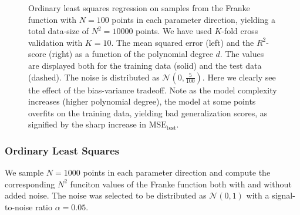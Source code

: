 \documentclass[dvipsnames, article, a4paper, oneside, 12pt]{memoir}
\newcommand{\N}{\mathcal{N}}
\begin{document}
\begin{figure}
    \centering
    \caption{Ordinary least squares regression on samples from the Franke
      function with \( N = 100 \) points in each parameter direction, yielding a total data-size of \( N^2 = 10000 \) points.
     We have used \( K \)-fold cross validation with \( K = 10 \).
     The mean squared error (left) and the \(R^2\)-score (right) as
      a function of the polynomial degree \( d \). The values are displayed
      both for the training data (solid) and the test data (dashed). The
      noise is distributed as \( \N(0, \tfrac{5}{100})\). Here we clearly see the effect of the bias-variance tradeoff. Note as the model complexity increases (higher polynomial degree), the model at some points overfits on the training data, yielding bad generalization scores, as signified by the sharp increase in \( \mathrm{MSE}_{\mathrm{test}} \).}
    \label{fig:ols_scores}
  \end{figure}

  \subsubsection{Ordinary Least Squares}
  
  We sample \( N = 1000 \) points in each parameter direction and compute the
  corresponding \( N^2 \) funciton values of the Franke function both with and
  without added noise. The noise was selected to be distributed as \( \N(0,
  1) \) with a signal-to-noise ratio \( \alpha = 0.05\).
  
\end{document}
